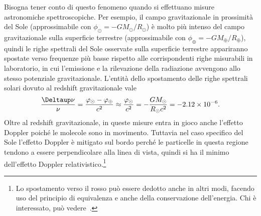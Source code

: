 Bisogna tener conto di questo fenomeno quando si effettuano misure astronomiche
spettroscopiche.  Per esempio, il campo gravitazionale in prossimità del Sole
(approssimabile con $\phi_{\odot} = -GM_{\odot}/R_{\odot}$) è molto più intenso
del campo gravitazionale sulla superficie terrestre (approssimabile con
$\phi_{\oplus} = -GM_{\oplus}/R_{\oplus}$), quindi le righe spettrali del Sole
osservate sulla superficie terrestre appariranno spostate verso frequenze più
basse rispetto alle corrispondenti righe misurabili in laboratorio, in cui
l'emissione e la rilevazione della radiazione avvengono allo stesso potenziale
gravitazionale.  L'entità dello spostamento delle righe spettrali solari dovuto
al redshift gravitazionale vale
\begin{equation}
  \frac{\var \nu}{\nu} = \frac{\phi_{\odot} - \phi_{\oplus}}{c^{2}} \approx
  \frac{\phi_{\odot}}{c^{2}} = -\frac{GM_{\odot}}{R_{\odot}c^{2}} = \num{-2.12e-6}.
\end{equation}
Oltre al redshift gravitazionale, in queste misure entra in gioco anche
l'effetto Doppler poiché le molecole sono in movimento.  Tuttavia nel caso
specifico del Sole l'effetto Doppler è mitigato sul bordo perché le particelle
in questa regione tendono a essere perpendicolare alla linea di vista, quindi si
ha il minimo dell'effetto Doppler
relativistico.\footnote{Lo spostamento verso il rosso può essere dedotto anche
  in altri modi, facendo uso del principio di equivalenza e anche della
  conservazione dell'energia.  Chi è interessato, può
  vedere~\textcite[160-161]{ohanian:gravitazione}.}

